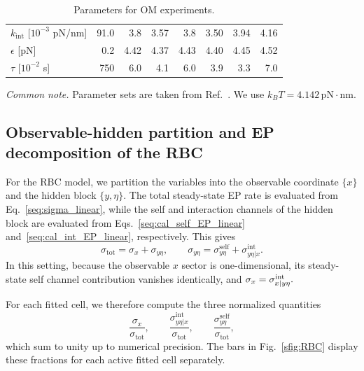 \documentclass[
 longbibliography,
 twocolumn,
 superscriptaddress,
 amsmath,
 amssymb,
 amsthm,
 amsfonts,
 prl,
 floatfix,
]{revtex4-2}
\begin{document}
\begin{widetext}
\begin{table}[h]
\begin{minipage}{0.48\textwidth}
\begin{tabular}{l rrrrrrr}
            $k_{\text{int}}$ [$10^{-3}$ pN/nm] & 91.0 & 3.8 & 3.57 & 3.8 & 3.50 & 3.94 & 4.16 \\
            $\epsilon$ [pN] & 0.2 & 4.42 & 4.37 & 4.43 & 4.40 & 4.45 & 4.52 \\
            $\tau$ [$10^{-2}$ s] & 750 & 6.0 & 4.1 & 6.0 & 3.9 & 3.3 & 7.0 \\
            \bottomrule
        \end{tabular}
        \caption{Parameters for OM experiments.}
        \label{stab:RBC_parameter_OM}
    \end{minipage}
    \vspace{0.5ex}
    \begin{minipage}{0.95\textwidth}
        \footnotesize
        \textit{Common note.} Parameter sets are taken from Ref.~\cite{terlizzi2024variance}.
        We use $k_B T = 4.142\,\mathrm{pN\cdot nm}$.
    \end{minipage}
\end{table}
\vspace*{-0.6\baselineskip}

\subsection{Observable-hidden partition and EP decomposition of the RBC}
\vspace*{-0.6\baselineskip}

For the RBC model, we partition the variables into the observable coordinate $\{x\}$ and the hidden block $\{y,\eta\}$. The total steady-state EP rate is evaluated from Eq.~\eqref{seq:sigma_linear}, while the self and interaction channels of the hidden block are evaluated from Eqs.~\eqref{seq:cal_self_EP_linear} and~\eqref{seq:cal_int_EP_linear}, respectively. This gives
\[
\sigma_{\mathrm{tot}}=\sigma_{x}+\sigma_{y\eta}, 
\qquad
\sigma_{y\eta}=\sigma^{\mathrm{self}}_{y\eta}+\sigma^{\mathrm{int}}_{y\eta|x}.
\]
In this setting, because the observable \(x\) sector is one-dimensional, its steady-state self channel contribution vanishes identically, and $\sigma_x=\sigma_{x|y\eta}^{\rm int}.$ 

For each fitted cell, we therefore compute the three normalized quantities
\[
\frac{\sigma_{x}}{\sigma_{\mathrm{tot}}},
\qquad
\frac{\sigma^{\mathrm{int}}_{y\eta|x}}{\sigma_{\mathrm{tot}}},
\qquad
\frac{\sigma^{\mathrm{self}}_{y\eta}}{\sigma_{\mathrm{tot}}},
\]
which sum to unity up to numerical precision. The bars in Fig.~\ref{sfig:RBC} display these fractions for each active fitted cell separately.


\end{widetext}
\end{document}
